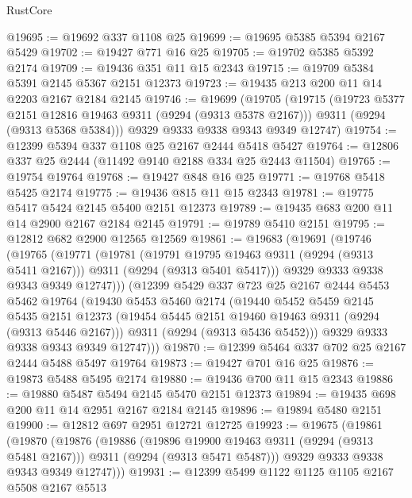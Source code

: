 \begin{lexlean}{RustCore}
\begin{coremodule}
@19695 := @19692 @337 @1108 @25
@19699 := @19695 @5385 @5394 @2167 @5429
@19702 := @19427 @771 @16 @25
@19705 := @19702 @5385 @5392 @2174
@19709 := @19436 @351 @11 @15 @2343
@19715 := @19709 @5384 @5391 @2145 @5367 @2151 @12373
@19723 := @19435 @213 @200 @11 @14 @2203 @2167 @2184 @2145
@19746 := @19699
    (@19705
      (@19715
        (@19723 @5377 @2151 @12816 @19463 @9311 (@9294 (@9313 @5378 @2167)))
        @9311
        (@9294 (@9313 @5368 @5384)))
      @9329
      @9333
      @9338
      @9343
      @9349
      @12747)
@19754 := @12399 @5394 @337 @1108 @25 @2167 @2444 @5418 @5427
@19764 := @12806 @337 @25 @2444 (@11492 @9140 @2188 @334 @25 @2443 @11504)
@19765 := @19754 @19764
@19768 := @19427 @848 @16 @25
@19771 := @19768 @5418 @5425 @2174
@19775 := @19436 @815 @11 @15 @2343
@19781 := @19775 @5417 @5424 @2145 @5400 @2151 @12373
@19789 := @19435 @683 @200 @11 @14 @2900 @2167 @2184 @2145
@19791 := @19789 @5410 @2151
@19795 := @12812 @682 @2900 @12565 @12569
@19861 := @19683
    (@19691
      (@19746
        (@19765
          (@19771
            (@19781
              (@19791 @19795 @19463 @9311 (@9294 (@9313 @5411 @2167)))
              @9311
              (@9294 (@9313 @5401 @5417)))
            @9329
            @9333
            @9338
            @9343
            @9349
            @12747)))
      (@12399
        @5429
        @337
        @723
        @25
        @2167
        @2444
        @5453
        @5462
        @19764
        (@19430
          @5453
          @5460
          @2174
          (@19440
            @5452
            @5459
            @2145
            @5435
            @2151
            @12373
            (@19454 @5445 @2151 @19460 @19463 @9311 (@9294 (@9313 @5446 @2167)))
            @9311
            (@9294 (@9313 @5436 @5452)))
          @9329
          @9333
          @9338
          @9343
          @9349
          @12747)))
@19870 := @12399 @5464 @337 @702 @25 @2167 @2444 @5488 @5497 @19764
@19873 := @19427 @701 @16 @25
@19876 := @19873 @5488 @5495 @2174
@19880 := @19436 @700 @11 @15 @2343
@19886 := @19880 @5487 @5494 @2145 @5470 @2151 @12373
@19894 := @19435 @698 @200 @11 @14 @2951 @2167 @2184 @2145
@19896 := @19894 @5480 @2151
@19900 := @12812 @697 @2951 @12721 @12725
@19923 := @19675
    (@19861
      (@19870
        (@19876
          (@19886
            (@19896 @19900 @19463 @9311 (@9294 (@9313 @5481 @2167)))
            @9311
            (@9294 (@9313 @5471 @5487)))
          @9329
          @9333
          @9338
          @9343
          @9349
          @12747)))
@19931 := @12399 @5499 @1122 @1125 @1105 @2167 @5508 @2167 @5513

\end{coremodule}
\end{lexlean}
